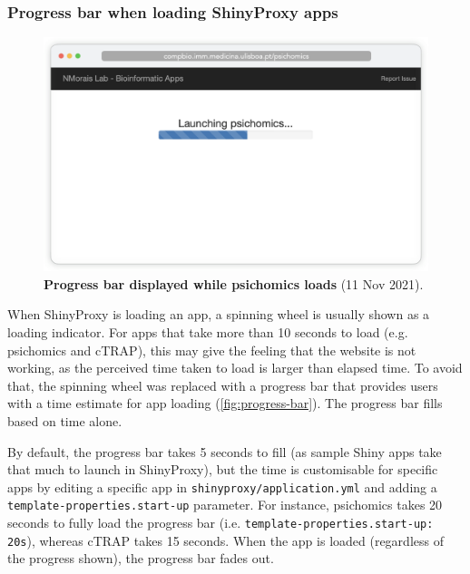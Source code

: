 \subsubsection{Progress bar when loading ShinyProxy apps}

\begin{figure}
  \vspace{-\intextsep}
  \includegraphics[width=\linewidth]{images/app-server/progress-bar}
  \caption[Screenshot of app loading]{\textbf{Progress bar displayed while psichomics loads} (11 Nov 2021).}
  \label{fig:progress-bar}
  \vspace{-\intextsep}
\end{figure}


When ShinyProxy is loading an app, a spinning wheel is usually shown as a loading indicator. For apps that take more than 10 seconds to load (e.g. psichomics and cTRAP), this may give the feeling that the website is not working, as the perceived time taken to load is larger than elapsed time. %
To avoid that, the spinning wheel was replaced with a progress bar that provides users with a time estimate for app loading (\autoref{fig:progress-bar}). The progress bar fills based on time alone.

By default, the progress bar takes 5 seconds to fill (as sample Shiny apps take that much to launch in ShinyProxy), but the time is customisable for specific apps by editing a specific app in \texttt{shinyproxy/application.yml} and adding a \texttt{template-properties.start-up} parameter. For instance, psichomics takes 20 seconds to fully load the progress bar (i.e. \texttt{template-properties.start-up: 20s}), whereas cTRAP takes 15 seconds. When the app is loaded (regardless of the progress shown), the progress bar fades out.

